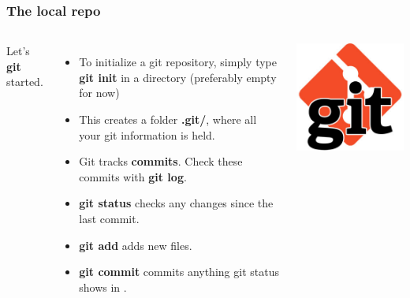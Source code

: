 \documentclass{beamer}
\begin{document}
\begin{frame}[fragile]
\frametitle{The local repo}
\begin{columns}
Let's \textbf{git} started.
\begin{itemize}
\item To initialize a git repository, simply type \textbf{git init} in a directory (preferably empty for now)
\item This creates a folder \textbf{.git/}, where all your git information is held.
\item Git tracks \textbf{commits}. Check these commits with \textbf{git log}.
\item \textbf{git status} checks any changes since the last commit.
\item \textbf{git add} adds new files.
\item \textbf{git commit} commits anything git status shows in \color{green}{green}.
\end{itemize}
\includegraphics[width=\textwidth]{git.jpg}
\end{columns}
\end{frame}
\end{document}
